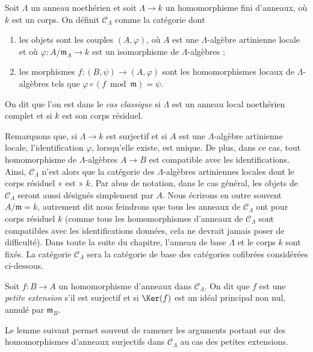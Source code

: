 \begin{definition}
\label{definition-CLambda}
Soit $\Lambda$ un anneau noethérien et soit $\Lambda \to k$ un homomorphisme
fini d'anneaux, où $k$ est un corps. On définit {\it $\mathcal{C}_\Lambda$}
comme la catégorie dont
\begin{enumerate}
\item les objets sont les couples $(A, \varphi)$, où $A$ est une
$\Lambda$-algèbre artinienne locale et où
$\varphi : A/\mathfrak m_A \to k$ est un isomorphisme de
$\Lambda$-algèbres ;
\item les morphismes $f : (B, \psi) \to (A, \varphi)$ sont les
homomorphismes locaux de $\Lambda$-algèbres tels que
$\varphi \circ (f \bmod \mathfrak m) = \psi$.
\end{enumerate}
On dit que l'on est dans le {\it cas classique} si $\Lambda$ est un anneau
local noethérien complet et si $k$ est son corps résiduel.
\end{definition}

\noindent
Remarquons que, si $\Lambda \to k$ est surjectif et si $A$ est une
$\Lambda$-algèbre artinienne locale, l'identification $\varphi$, lorsqu'elle
existe, est unique. De plus, dans ce cas, tout homomorphisme de
$\Lambda$-algèbres $A \to B$ est compatible avec les identifications. Ainsi,
$\mathcal{C}_\Lambda$ n'est alors que la catégorie des $\Lambda$-algèbres
artiniennes locales dont le corps résiduel « est » $k$. Par abus de notation,
dans le cas général, les objets de $\mathcal{C}_\Lambda$ seront aussi désignés
simplement par $A$. Nous écrirons en outre souvent
$A/\mathfrak m = k$, autrement dit nous feindrons que tous les anneaux de
$\mathcal{C}_\Lambda$ ont pour corps résiduel $k$ (comme tous les
homomorphismes d'anneaux de $\mathcal{C}_\Lambda$ sont compatibles avec les
identifications données, cela ne devrait jamais poser de difficulté).
Dans toute la suite du chapitre, l'anneau de base $\Lambda$ et le corps $k$
sont fixés. La catégorie $\mathcal{C}_\Lambda$ sera la catégorie de base des
catégories cofibrées considérées ci-dessous.

\begin{definition}
\label{definition-small-extension}
Soit $f: B \to A$ un homomorphisme d'anneaux dans $\mathcal{C}_\Lambda$.
On dit que $f$ est une {\it petite extension} s'il est surjectif et si
$\Ker(f)$ est un idéal principal non nul, annulé par $\mathfrak{m}_B$.
\end{definition}

\noindent
Le lemme suivant permet souvent de ramener les arguments portant sur des
homomorphismes d'anneaux surjectifs dans $\mathcal{C}_\Lambda$ au cas des
petites extensions.

